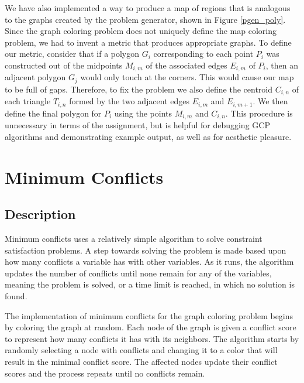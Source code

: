 \documentclass{article}
\begin{document}
	We have also implemented a way to produce a map of regions that is analogous to the graphs created by the problem generator, shown in Figure \ref{pgen_poly}.  
	Since the graph coloring problem does not uniquely define the map coloring problem, we had to invent a metric that produces appropriate graphs. To define our metric, consider that if a polygon $G_i$ corresponding to each point $P_i$ was constructed out of the midpoints $M_{i,m}$ of the associated edges $E_{i,m}$ of $P_i$, then an adjacent polygon $G_j$ would only touch at the corners. This would cause our map to be full of gaps. Therefore, to fix the problem we also define the centroid $C_{i,n}$ of each triangle $T_{i,n}$ formed by the two adjacent edges $E_{i,m}$ and $E_{i,m+1}$. We then define the final polygon for $P_i$ using the points $M_{i,m}$ and $C_{i,n}$. This procedure is unnecessary in terms of the assignment, but is helpful for debugging GCP algorithms and demonstrating example output, as well as for aesthetic pleasure.
		
\section{Minimum Conflicts}
	\subsection{Description}
		
		Minimum conflicts uses a relatively simple algorithm to solve constraint satisfaction problems.  A step towards solving the problem is made based upon how many conflicts a variable has with other variables.  As it runs, the algorithm updates the number of conflicts until none remain for any of the variables, meaning the problem is solved, or a time limit is reached, in which no solution is found.
		
		The implementation of minimum conflicts for the graph coloring problem begins by coloring the graph at random.  Each node of the graph is given a conflict score to represent how many conflicts it has with its neighbors.  The algorithm starts by randomly selecting a node with conflicts and changing it to a color that will result in the minimal conflict score.  The affected nodes update their conflict scores and the process repeats until no conflicts remain.
\end{document}
